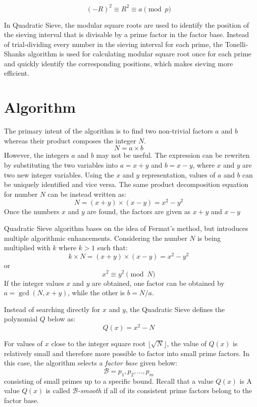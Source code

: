 \documentclass[11pt,a4paper]{article}
\begin{document}
$$
(-R)^2 \equiv R^2 \equiv a \pmod p
$$

In Quadratic Sieve, the modular square roots are used to identify the position of the sieving interval that is divisable by a prime factor in the factor base. Instead of trial-dividing every number in the sieving interval for each prime, the Tonelli-Shanks algorithm is used for calculating modular square root once for each prime and quickly identify the corresponding positions, which makes sieving more efficient.

\section*{Algorithm}

The primary intent of the algorithm is to find two non-trivial factors $a$ and $b$ whereas their product composes the integer $N$.
\[
    N = a \times b
\]
However, the integers $a$ and $b$ may not be useful. The expression can be rewriten by substituting the two variables into $a=x+y$ and $b=x-y$, where $x$ and $y$ are two new integer variables. Using the $x$ and $y$ representation, values of $a$ and $b$ can be uniquely identified and vice versa. The same product decomposition equation for number $N$ can be instead written as:
\[
    N = (x + y) \times (x - y) = x^2 - y^2
\]
Once the numbers $x$ and $y$ are found, the factors are given as $x+y$ and $x-y$

Quadratic Sieve algorithm bases on the idea of Fermat's method, but introduces multiple algorithmic enhancements. Considering the number $N$ is being multiplied with $k$ where $k>1$ such that:
\[
    k \times N = (x + y) \times (x - y) = x^2 - y^2
\]
or
\[
    x^2 \equiv y^2 \pmod N
\]
If the integer values $x$ and $y$ are obtained, one factor can be obtained by $a = \gcd(N, x+y)$, while the other is $b = N/a$.

Instead of searching directly for $x$ and $y$, the Quadratic Sieve defines the polynomial $Q$ below as:
\[
    Q(x) = x^2 - N
\]

For values of $x$ close to the integer square root $\lfloor \sqrt{N} \rfloor$, the value of $Q(x)$ is relatively small and therefore more possible to factor into small prime factors. In this case, the algorithm selects a \emph{factor base} given below:
\[
    \mathcal{B}={p_1,p_2,\ldots,p_m}
\]
consisting of small primes up to a specific bound. Recall that a value $Q(x)$ is  A value $Q(x)$ is called \emph{$\mathcal{B}$-smooth} if all of its consistent prime factors belong to the factor base.
\end{document}
